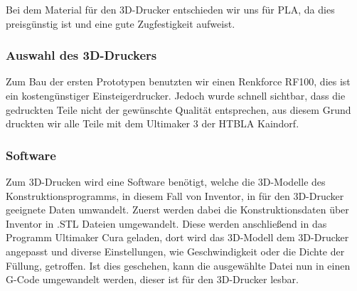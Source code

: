 Bei dem Material für den 3D-Drucker entschieden wir uns für PLA, da dies preisgünstig ist und eine gute Zugfestigkeit aufweist.

\subsubsection{Auswahl des 3D-Druckers}
Zum Bau der ersten Prototypen benutzten wir einen Renkforce RF100, dies ist ein kostengünstiger Einsteigerdrucker.
Jedoch wurde schnell sichtbar, dass die gedruckten Teile nicht der gewünschte Qualität entsprechen, aus diesem Grund
druckten wir alle Teile mit dem Ultimaker 3 der HTBLA Kaindorf.

\subsubsection{Software}
Zum 3D-Drucken wird eine Software benötigt, welche die 3D-Modelle des Konstruktionsprogramms, in diesem Fall von Inventor,
in für den 3D-Drucker geeignete Daten umwandelt.
Zuerst werden dabei die Konstruktionsdaten über Inventor in .STL Dateien umgewandelt.
Diese werden anschließend in das Programm Ultimaker Cura geladen, dort wird das 3D-Modell dem 3D-Drucker angepasst und diverse Einstellungen, wie
Geschwindigkeit oder die Dichte der Füllung, getroffen.
Ist dies geschehen, kann die ausgewählte Datei nun in einen G-Code umgewandelt werden, dieser ist für den 3D-Drucker lesbar.


